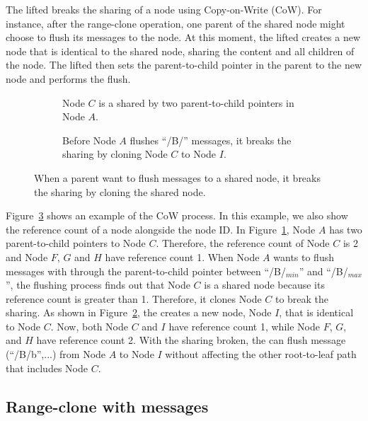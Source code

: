 The lifted \bedag breaks the sharing of a node using Copy-on-Write (CoW).
For instance, after the range-clone operation, one parent of the shared node
might choose to flush its messages to the node.
At this moment, the lifted \bedag creates a new node that is identical to the
shared node, sharing the content and all children of the node.
The lifted \bedag then sets the parent-to-child pointer in the parent to the new
node and performs the flush.

\begin{figure}
    \begin{subfigure}{\textwidth}
        \centering
        
        \caption{\label{subfig:cow-1} Node $C$ is a shared by two
            parent-to-child pointers in Node $A$.}
    \end{subfigure}
    \begin{subfigure}{\textwidth}
        \centering
        
        \caption{\label{subfig:cow-2} Before Node $A$ flushes ``/B/'' messages,
        it breaks the sharing by cloning Node $C$ to Node $I$.}
    \end{subfigure}
    \caption[\bedags break node sharing with CoW]{\label{fig:cow}
        When a parent want to flush messages to a shared node,
        it breaks the sharing by cloning the shared node.}
\end{figure}

Figure~\ref{fig:cow} shows an example of the CoW process.
In this example, we also show the reference count of a node alongside the node
ID.
In Figure~\ref{subfig:cow-1}, Node $A$ has two parent-to-child pointers to
Node $C$.
Therefore, the reference count of Node $C$ is 2 and
Node $F$, $G$ and $H$ have reference count 1.
When Node $A$ wants to flush messages with through the parent-to-child pointer
between ``/B/$_{min}$'' and ``/B/$_{max}$'',
the flushing process finds out that Node $C$ is a shared node because its
reference count is greater than 1.
Therefore, it clones Node $C$ to break the sharing.
As shown in Figure~\ref{subfig:cow-2}, the \bedag creates a new node, Node $I$,
that is identical to Node $C$.
Now, both Node $C$ and $I$ have reference count 1, while Node $F$, $G$, and
$H$ have reference count 2.
With the sharing broken, the \bedag can flush message \putm(``/B/b'',...) from
Node $A$ to Node $I$ without affecting the other root-to-leaf path that
includes Node $C$.

\subsection{Range-clone with \goto messages}
\label{sec:rc:goto}

